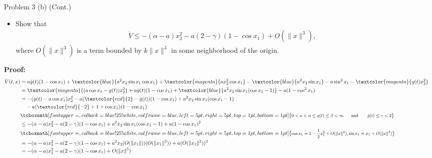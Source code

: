 \documentclass[8pt]{beamer}
\begin{document}
\begin{frame}[t]{Problem 3 (b) (Cont.)}
  \begin{block}{}
\begin{itemize}
\item[(b)] Show that
\begin{align*}
\dot V\leq-(\alpha-a)x_2^2-a(2-\gamma)(1-\cos x_1)+O(\|x\|^3),
\end{align*}
where $O(\|x\|^3)$ is a term bounded by $k\|x\|^3$ in some neighborhood of the origin.
\end{itemize}
\end{block}
{\bf Proof:}
\begin{align*}
  \dot{V}(t,x) &=a\dot{g}(t)(1-\cos x_1)+\textcolor{blue}{a^2x_2\sin x_1\cos x_1}+\textcolor{magenta}{ax_2^2\cos x_1}-\textcolor{blue}{a^2x_2\sin x_1}-a\sin^2x_1-\textcolor{magenta}{g(t)x_2^2}\\
  &=\textcolor{magenta}{(a\cos x_1-g(t))x_2^2}+a\dot{g}(t)(1-\cos x_1)+\textcolor{blue}{a^2x_2\sin x_1(\cos x_1-1)}-a(1-\cos^2x_1)\\
  &=-(g(t)-a\cos x_1)x_2^2-a(\textcolor{red}{2}-\dot{g}(t))(1-\cos x_1)+a^2x_2\sin x_1(\cos x_1-1)\\
  &\quad -a(\textcolor{red}{-2}+1+\cos x_1)(1-\cos x_1)\\
  &\tcboxmath[fontupper=\footnotesize,colback=blue!25!white,colframe=blue,left=5pt,right=5pt,top=1pt,bottom=1pt]{\begin{aligned}
      0<a<\alpha\leq g(t)\leq \beta<\infty ~~~~~\mbox{and}~~~~~~\dot g(t)\leq \gamma<2
    \end{aligned}}\\
  &\leq-(\alpha-a)x_2^2-a(2-\gamma)(1-\cos x_1) +a^2x_2\sin x_1(\cos x_1-1) +a(1-\cos x_1)^2\\
  &\tcboxmath[fontupper=\footnotesize,colback=blue!25!white,colframe=blue,left=5pt,right=5pt,top=1pt,bottom=1pt]{\begin{aligned}
    \cos x_1=1-\frac{1}{2}x_1^2+O(\|x\|^4),\sin x_1=x_1+O(\|x\|^3)
  \end{aligned}}\\
  &=-(\alpha-a)x_2^2-a(2-\gamma)(1-\cos x_1) +a^2x_2(O(\|x_1\|))(O(\|x_1\|^2)) +a(O(\|x_1\|^2))^2\\
  &=-(\alpha-a)x_2^2-a(2-\gamma)(1-\cos x_1) +O(\|x\|^3)
\end{align*}
\end{frame}
\end{document}
